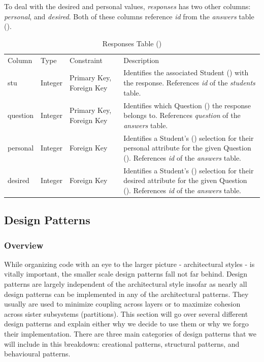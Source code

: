 \documentclass[12pt,letterpaper]{article}
\begin{document}
To deal with the desired and personal values, \textit{responses} has two other columns: \textit{personal}, and \textit{desired}. Both of these columns reference \textit{id} from the \textit{answers} table ().

\begin{table}[H]
	\caption{Responses Table ()} 
	\begin{tabu} to \textwidth {l l X X[4]}
		\tableheader{}Column & Type & Constraint & Description \\
		stu      & Integer & Primary Key,\newline
		                     Foreign Key          & Identifies the associated Student () with the response. References \textit{id} of the 
		                                            \textit{students} table. \\
		question & Integer & Primary Key,\newline
		                     Foreign Key          & Identifies which Question () the response belongs to. References \textit{question}
		                                            of the \textit{answers} table. \\
		personal & Integer & Foreign Key          & Identifies a Student's  () selection for their personal attribute for the 
		                                            given Question (). References \textit{id} of the \textit{answers} table. \\
		desired  & Integer & Foreign Key          & Identifies a Student's () selection for their desired attribute for the 
		                                            given Question (). References \textit{id} of the \textit{answers} table. \\
	\end{tabu}
\end{table}

\subsection{Design Patterns}
\subsubsection{Overview}
While organizing code with an eye to the larger picture - architectural styles - is vitally important, the smaller scale design patterns fall not far behind. Design patterns are largely independent of the architectural style insofar as nearly all design patterns can be implemented in any of the architectural patterns. They usually are used to minimize coupling across layers or to maximize cohesion across sister subsystems (partitions). This section will go over several different design patterns and explain either why we decide to use them or why we forgo their implementation. There are three main categories of design patterns that we will include in this breakdown: creational patterns, structural patterns, and behavioural patterns.
\end{document}
